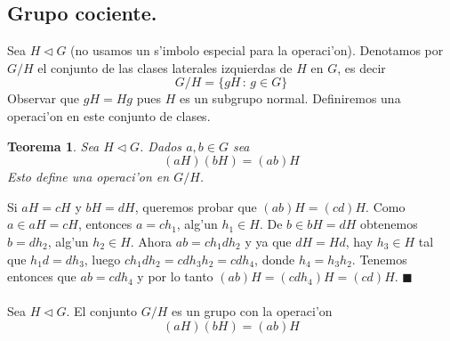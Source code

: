 \documentclass[a4paper,openright,12pt]{book}
\numberwithin{equation}{section} %
\newtheorem{teorema}{Teorema}[section] %
\newenvironment{proof}{\noindent{\it Demostracion:}}{\hfill$\blacksquare$} %
\begin{document}
\subsection{Grupo cociente.}
Sea $H \triangleleft G$ (no usamos un s'imbolo especial para la operaci'on). Denotamos por $G/H$ el conjunto de las clases laterales izquierdas de $H$ en $G$, es decir
\[
G/H=\{gH\,:\, g\in G\}
\]
Observar que $gH=Hg$ pues $H$ es un subgrupo normal. Definiremos una operaci'on en este conjunto de clases.
\begin{teorema}
Sea $H \triangleleft G$. Dados $a,b \in G$ sea 
\[
(aH)(bH)=(ab)H
\]
Esto define una operaci'on en $G/H$.
\end{teorema}
\begin{proof}
Si $aH=cH$ y $bH=dH$, queremos probar que $(ab)H=(cd)H$. Como $a \in aH = cH$, entonces $a=ch_{1}$, alg'un $h_{1}\in H$. De $b \in bH=dH$ obtenemos $b=dh_{2}$, alg'un $h_{2}\in H$. Ahora $ab=ch_{1}dh_{2}$ y ya que $dH=Hd$, hay $h_{3}\in H$ tal que $h_{1}d=dh_{3}$, luego $ch_{1}dh_{2}=cdh_{3}h_{2}=cdh_{4}$, donde $h_{4}=h_{3}h_{2}$. Tenemos entonces que $ab=cdh_{4}$ y por lo tanto $(ab)H=(cdh_{4})H=(cd)H$.
\end{proof}
\\
\\
Sea $H \triangleleft G$. El conjunto $G/H$ es un grupo con la operaci'on 
\[
(aH)(bH)=(ab)H
\]
\end{document}
